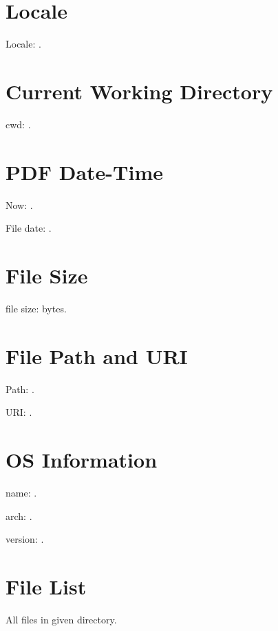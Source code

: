 \documentclass{article}
\begin{document}
\section{Locale}

\TeXOSQueryLocale{\result}
Locale: \texttt{\result}.

\section{Current Working Directory}

\TeXOSQueryCwd{\result}
cwd: \texttt{\result}.

\section{PDF Date-Time}
\TeXOSQueryNow{\result}
Now: \texttt{\result}.

File date: \texttt{\result}.

\section{File Size}

file size: \result bytes.

\section{File Path and URI}

Path: \texttt{\result}.

URI: \texttt{\result}.

\section{OS Information}

\TeXOSQueryName{\result}
name: \result.

\TeXOSQueryArch{\result}
arch: \result.

\TeXOSQueryVersion{\result}
version: \texttt{\result}.

\section{File List}

All files in given directory.

\renewcommand{\do}[1]{\texttt{#1}.\par}
\end{document}
